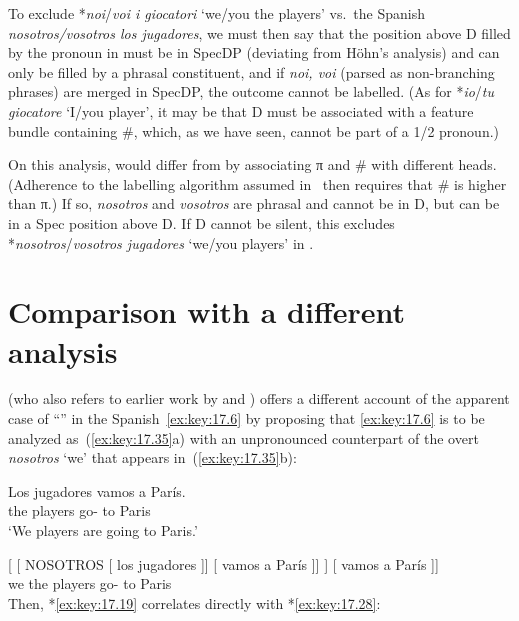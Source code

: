 \documentclass[output=paper]{langsci/langscibook}
\begin{document}
To exclude *\emph{noi}/\emph{voi i giocatori} ‘we/you the players’ vs.\ the
Spanish \emph{nosotros/vos\-otros los jugadores}, we must then say that
the position above D filled by the pronoun in  must be in SpecDP
(deviating from Höhn’s analysis) and can only be filled by a phrasal
constituent, and if \emph{noi, voi} (parsed as non-branching phrases) are
merged in SpecDP, the outcome cannot be labelled. (As for *\emph{io}/\emph{tu
giocatore} ‘I/you player’, it may be that D must be associated with a feature
bundle containing \#, which, as we have seen, cannot be part of a 1/2 \Sg{}
pronoun.)

On this analysis,  would differ from  by associating
π and \# with different heads. (Adherence to the labelling
algorithm assumed in~ then requires that \# is higher than
π.) If so, \emph{nosotros} and \emph{vosotros} are phrasal and cannot be in D,
but can be in a Spec position above D. If D cannot be silent, this excludes
*\emph{nosotros}/\emph{vosotros jugadores} ‘we/you players’ in .

\section{Comparison with a different analysis}\label{sec:key:17.7}

\textcite{Hoehn2016} (who also refers to earlier work by \citealt{Hurtado1985}
and \citealt{AckemaNeeleman2013}) offers a different account of the apparent
case of “” in the Spanish~\eqref{ex:key:17.6} by proposing
that \eqref{ex:key:17.6} is to be analyzed as~(\ref{ex:key:17.35}a) with an
unpronounced counterpart of the overt \emph{nosotros} ‘we’ that appears
in~(\ref{ex:key:17.35}b):

\begin{exe}
\exi{\eqref{ex:key:17.6}}
    \gll    Los jugadores vamos a París.\\
            the players      go-\Fpl{} to Paris\\
    \glt    ‘We players are going to Paris.’
\end{exe}

\ea\label{ex:key:17.35}
    \ea {}[ [ NOSOTROS [ los jugadores ]] [ vamos a París ]]
    \ex
    \gll    [\tss{IP} [\tss{PersP} nosotros [\tss{DP} los jugadores ]] [ vamos a París ]]\\
            {} {} we {} the players {} go-\Fpl{} to Paris\\
    \z
\z
Then, *\eqref{ex:key:17.19} correlates directly with *\eqref{ex:key:17.28}:
\end{document}
